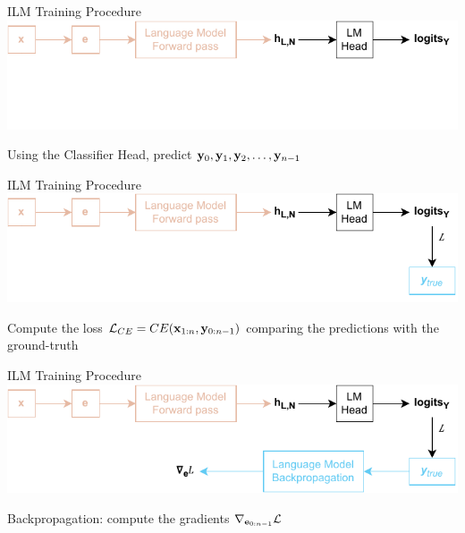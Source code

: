 \begin{frame}[noframenumbering]{ILM Training Procedure}
    \includegraphics[width=\linewidth]{assets/grad_lm_head_parallelism_3.drawio.pdf}
    \vspace{1.5cm}
    
    \centering
    Using the Classifier Head, predict $\mathbf{y}_0, \mathbf{y}_1, \mathbf{y}_2, \dots, \mathbf{y}_{n-1}$
\end{frame}

\begin{frame}[noframenumbering]{ILM Training Procedure}
    \includegraphics[width=\linewidth]{assets/grad_lm_head_parallelism_4.drawio.pdf}
    \vspace{1.5cm}
    
    \centering
    Compute the loss $\mathcal{L}_{CE} = CE(\mathbf{x}_{1:n}, \mathbf{y}_{0:n-1})$ comparing the predictions with the ground-truth
\end{frame}

\begin{frame}[noframenumbering]{ILM Training Procedure}
    \includegraphics[width=\linewidth]{assets/grad_lm_head_parallelism_5.drawio.pdf}
    \vspace{1.5cm}
    
    \centering
    Backpropagation: compute the gradients $\nabla_{\mathbf{e}_{0:n-1}} \mathcal{L}$
\end{frame}

